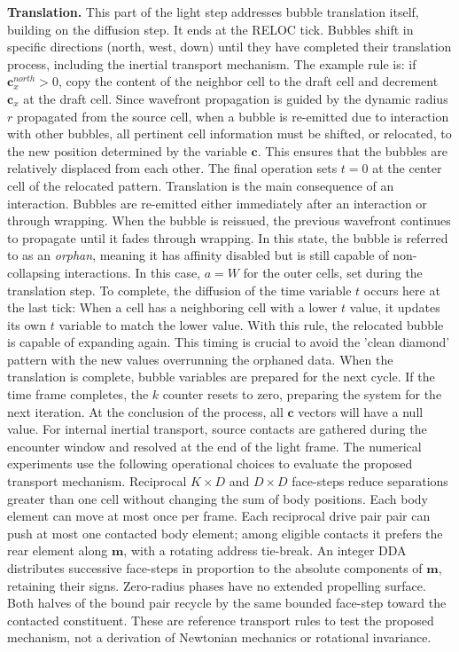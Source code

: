 \documentclass[a4paper]{article}
\begin{document}
\medskip\noindent\textbf{Translation.} This part of the light step addresses bubble translation itself, building on the diffusion step.
It ends at the RELOC tick. Bubbles shift in specific directions (north, west, down) until they have completed their translation process, including the inertial transport mechanism.
The example rule is: if $\textbf{c}_x^{north}>0$, copy the content of the neighbor cell to the draft cell and decrement $\textbf{c}_x$ at the draft cell.
Since wavefront propagation is guided by the dynamic radius $r$ propagated from the source cell, when a bubble is re-emitted due to interaction with other bubbles, all pertinent cell information must be shifted, or relocated, to the new position determined by the variable $\textbf{c}$.
This ensures that the bubbles are relatively displaced from each other.
The final operation sets $t=0$ at the center cell of the relocated pattern.
Translation is the main consequence of an interaction.
Bubbles are re-emitted either immediately after an interaction or through wrapping.
When the bubble is reissued, the previous wavefront continues to propagate until it fades through wrapping.
In this state, the bubble is referred to as an \textit{orphan}, meaning it has affinity disabled but is still capable of non-collapsing interactions.
In this case, $a=W$ for the outer cells, set during the translation step.
To complete, the diffusion of the time variable $t$ occurs here at the last tick: When a cell has a neighboring cell with a lower $t$ value, it updates its own $t$ variable to match the lower value.
With this rule, the relocated bubble is capable of expanding again.
This timing is crucial to avoid the 'clean diamond' pattern with the new values overrunning the orphaned data.
When the translation is complete, bubble variables are prepared for the next cycle.
If the time frame completes, the $k$ counter resets to zero, preparing the system for the next iteration.
At the conclusion of the process, all $\boldsymbol{c}$ vectors will have a null value.
For internal inertial transport, source contacts are gathered during the encounter window and resolved at the end of the light frame. The numerical experiments use the following operational choices to evaluate the proposed transport mechanism. Reciprocal $K\times D$ and $D\times D$ face-steps reduce separations greater than one cell without changing the sum of body positions. Each body element can move at most once per frame. Each reciprocal drive pair pair can push at most one contacted body element; among eligible contacts it prefers the rear element along $\boldsymbol{m}$, with a rotating address tie-break. An integer DDA distributes successive face-steps in proportion to the absolute components of $\boldsymbol{m}$, retaining their signs. Zero-radius phases have no extended propelling surface. Both halves of the bound pair recycle by the same bounded face-step toward the contacted constituent. These are reference transport rules to test the proposed mechanism, not a derivation of Newtonian mechanics or rotational invariance.
\end{document}
